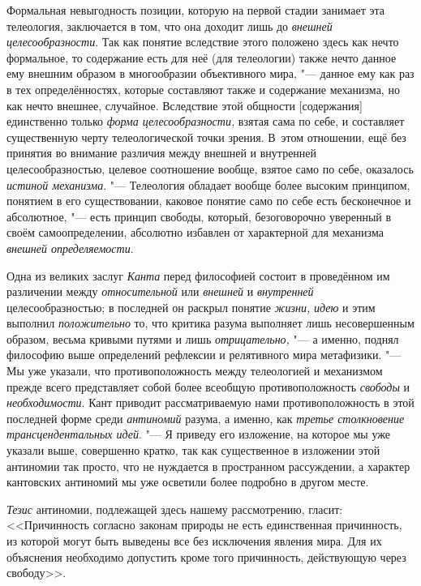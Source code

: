Формальная невыгодность позиции, которую на первой стадии
занимает эта телеология, заключается в том, что она доходит лишь до
{\em внешней целесообразности}.
Так как понятие вследствие этого положено здесь как нечто
формальное, то содержание есть для неё (для телеологии) также нечто данное
ему внешним образом в многообразии объективного мира, "---
данное ему как раз в тех определённостях, которые составляют
также и содержание механизма, но как нечто внешнее, случайное. Вследствие
этой общности [содержания] единственно только
{\em форма целесообразности,}
взятая сама по себе, и составляет существенную черту
телеологической точки зрения. В~этом отношении, ещё без принятия во
внимание различия между внешней и внутренней целесообразностью, целевое
соотношение вообще, взятое само по себе, оказалось
{\em истиной механизма}. "---
Телеология обладает вообще более высоким принципом, понятием
в его существовании, каковое понятие само по себе есть бесконечное и
абсолютное, "--- есть принцип свободы, который, безоговорочно
уверенный в своём самоопределении, абсолютно избавлен от характерной для
механизма {\em внешней определяемости}.

Одна из великих заслуг
{\em Канта} перед
философией состоит в проведённом им различении между
{\em относительной} или
{\em внешней} и
{\em внутренней}
целесообразностью; в последней он раскрыл понятие
{\em жизни,}
{\em идею} и этим выполнил
{\em положительно} то,
что критика разума выполняет лишь несовершенным образом, весьма кривыми
путями и лишь {\em отрицательно,} "---
а именно, поднял философию выше определений рефлексии и
релятивного мира метафизики. "--- Мы уже указали, что
противоположность между телеологией и механизмом прежде всего представляет
собой более всеобщую противоположность
{\em свободы} и
{\em необходимости}. Кант
приводит рассматриваемую нами противоположность в этой последней форме
среди {\em антиномий}
разума, а именно, как
{\em третье столкновение
трансцендентальных идей}. "--- Я приведу его изложение, на
которое мы уже указали выше, совершенно кратко, так как существенное в
изложении этой антиномии так просто, что не нуждается в пространном
рассуждении, а характер кантовских антиномий мы уже осветили
более подробно в другом месте.

{\em Тезис} антиномии,
подлежащей здесь нашему рассмотрению, гласит: <<Причинность согласно законам
природы не есть единственная причинность, из которой могут быть выведены
все без исключения явления мира. Для их объяснения необходимо допустить
кроме того причинность, действующую через свободу>>.

